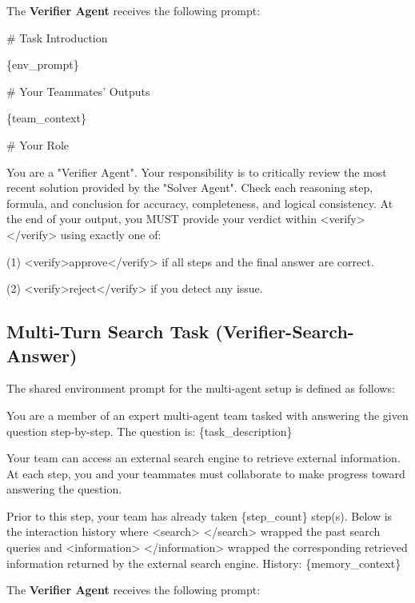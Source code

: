 The \textbf{Verifier Agent} receives the following prompt:

\begin{promptbox}[title=Verifier Agent Prompt]
\# Task Introduction

\{env\_prompt\}

\# Your Teammates' Outputs

\{team\_context\}

\# Your Role

You are a "Verifier Agent". Your responsibility is to critically review the most recent solution provided by the "Solver Agent". Check each reasoning step, formula, and conclusion for accuracy, completeness, and logical consistency.
At the end of your output, you MUST provide your verdict within <verify> </verify> using exactly one of:

(1) <verify>approve</verify> if all steps and the final answer are correct.

(2) <verify>reject</verify> if you detect any issue.
\end{promptbox}


\subsection{Multi-Turn Search Task (Verifier-Search-Answer)}
The shared environment prompt for the multi-agent setup is defined as follows:

\begin{promptbox}[title=Environment Prompt]
You are a member of an expert multi-agent team tasked with answering the given question step-by-step.
The question is: \{task\_description\}

Your team can access an external search engine to retrieve external information. At each step, you and your teammates must collaborate to make progress toward answering the question.

Prior to this step, your team has already taken \{step\_count\} step(s). Below is the interaction history where <search> </search> wrapped the past search queries and <information> </information> wrapped the corresponding retrieved information returned by the external search engine. History:
\{memory\_context\}
\end{promptbox}

The \textbf{Verifier Agent} receives the following prompt:

